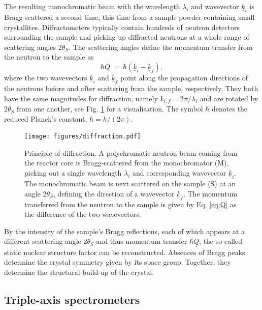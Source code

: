 The resulting monochromatic beam with the wavelength $\lambda_i$ and wavevector $\underline{k}_i$ is Bragg-scattered a second time, this time from a sample powder containing small crystallites. Diffractometers typically contain hundreds of neutron detectors surrounding the sample and picking up diffracted neutrons at a whole range of scattering angles $2 \theta_S$. The scattering angles define the momentum transfer from the neutron to the sample as \cite[p. 11]{Shirane2002}
\begin{equation}
	\label{eq:Q}
	\hbar \underline{Q} \ =\  \hbar \left( \underline{k}_i - \underline{k}_f \right),
\end{equation}
where the two wavevectors $\underline{k}_i$ and $\underline{k}_f$ point along the propagation directions of the neutrons before and after scattering from the sample, respectively. They both have the same magnitudes for diffraction, namely $k_{i,f} = 2\pi / \lambda_i$ and are rotated by $2\theta_S$ from one another, see Fig. \ref{fig:diffraction} for a visualisation. The symbol $\hbar$ denotes the reduced Planck's constant, $\hbar = h / \left( 2\pi \right)$.

\begin{figure}[htb]
	\centering
	\texttt{[image: figures/diffraction.pdf]}
	\caption{Principle of diffraction. A polychromatic neutron beam coming from the reactor core is Bragg-scattered from the monochromator (M), picking out a single wavelength $\lambda_i$ and corresponding wavevector $\underline{k}_i$. The monochromatic beam is next scattered on the sample (S) at an angle $2\theta_S$, defining the direction of a wavevector $\underline{k}_f$. The momentum transferred from the neutron to the sample is given by Eq. \ref{eq:Q} as the difference of the two wavevectors.}
	\label{fig:diffraction}
\end{figure}

By the intensity of the sample's Bragg reflections, each of which appears at a different scattering angle $2\theta_S$ and thus momentum transfer $\hbar \underline{Q}$, the so-called static nuclear structure factor \cite[p. 25]{Shirane2002} can be reconstructed. Absences of Bragg peaks determine the crystal symmetry given by its space group. Together, they determine the structural build-up of the crystal.


\subsection{Triple-axis spectrometers}


